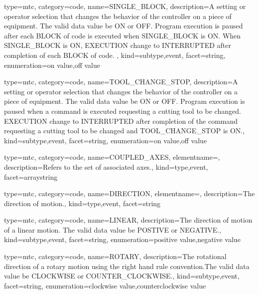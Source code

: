 {
  type=mtc,
  category=code,
  name={SINGLE\_BLOCK},
  description={A setting or operator selection that changes the behavior of the controller on a piece of equipment.  The \gls{valid data value} \must be ON or OFF. Program execution is paused after each BLOCK of code is executed when SINGLE\_BLOCK is ON.   \newline When SINGLE\_BLOCK is ON, EXECUTION \must change to INTERRUPTED after completion of each BLOCK of code. },
  kind={subtype,event},
  facet={\gls{string}},
  enumeration={\gls{on value},\gls{off value}}
}


{
  type=mtc,
  category=code,
  name={TOOL\_CHANGE\_STOP},
  description={A setting or operator selection that changes the behavior of the controller on a piece of equipment.  The \gls{valid data value} \must be ON or OFF. Program execution is paused when a command is executed requesting a cutting tool to be changed. EXECUTION \must change to INTERRUPTED after completion of the command requesting a cutting tool to be changed and TOOL\_CHANGE\_STOP is ON.},
  kind={subtype,event},
  facet={\gls{string}},
  enumeration={\gls{on value},\gls{off value}}
}


{
  type=mtc,
  category=code,
  name={COUPLED\_AXES},
  elementname=,
  description={Refers to the set of associated axes.},
  kind={type,event},
  facet={\gls{arraystring}}
}


{
  type=mtc,
  category=code,
  name={DIRECTION},
  elementname=,
  description={The direction of motion.},
  kind={type,event},
  facet={\gls{string}}
}


{
  type=mtc,
  category=code,
  name={LINEAR},
  description={The direction of motion of a linear motion.   The \gls{valid data value} \must be POSTIVE or NEGATIVE.},
  kind={subtype,event},
  facet={\gls{string}},
  enumeration={\gls{positive value},\gls{negative value}}
}


{
  type=mtc,
  category=code,
  name={ROTARY},
  description={The rotational direction of a rotary motion using the right hand rule convention.The \gls{valid data value} \must be CLOCKWISE or COUNTER\_CLOCKWISE.},
  kind={subtype,event},
  facet={\gls{string}},
  enumeration={\gls{clockwise value},\gls{counterclockwise value}}
}


